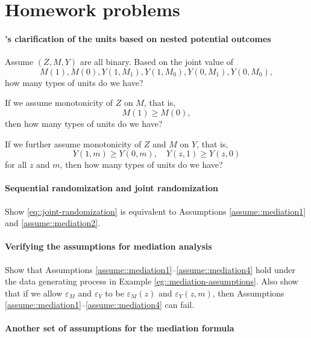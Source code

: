  

\section{Homework problems}\label{chapter::mediation-problmes}



\paragraph{\citet{Robins::1992}'s clarification of the units based on nested potential outcomes}\label{hw::robins1992-latentgroups}


Assume $(Z, M, Y)$ are all binary. Based on the joint value of 
$$
M(1), M(0),  Y(1, M_1), Y(1, M_0), Y(0, M_1), Y(0, M_0) ,
$$
how many types of units do we have?

If we assume monotonicity of $Z$ on $M$, that is,
$$
M(1) \geq  M(0),
$$
then how many types of units do we have?

If we further assume monotonicity of $Z$ and $M$ on $Y$, that is,
$$
Y(1, m) \geq Y(0, m),  \quad Y(z, 1) \geq Y(z, 0)
$$
for all $z$ and $m$, then how many types of units do we have?


\paragraph{Sequential randomization and joint randomization}\label{para::sr-jr}

Show \eqref{eq::joint-randomization} is equivalent to Assumptions \ref{assume::mediation1} and \ref{assume::mediation2}. 


\paragraph{Verifying the assumptions for mediation analysis}\label{para::mediation-assumptions-DGP}

Show that Assumptions \ref{assume::mediation1}--\ref{assume::mediation4} hold under the data generating process in Example \ref{eg::mediation-assumptions}. 
Also show that if we allow $  \varepsilon_M$ and $\varepsilon_Y$ to be $ \varepsilon_M(z)$ and $\varepsilon_Y(z,m)$, then Assumptions \ref{assume::mediation1}--\ref{assume::mediation4} can fail. 
 
 \paragraph{Another set of assumptions for the mediation formula}\label{para::alternative-si}



